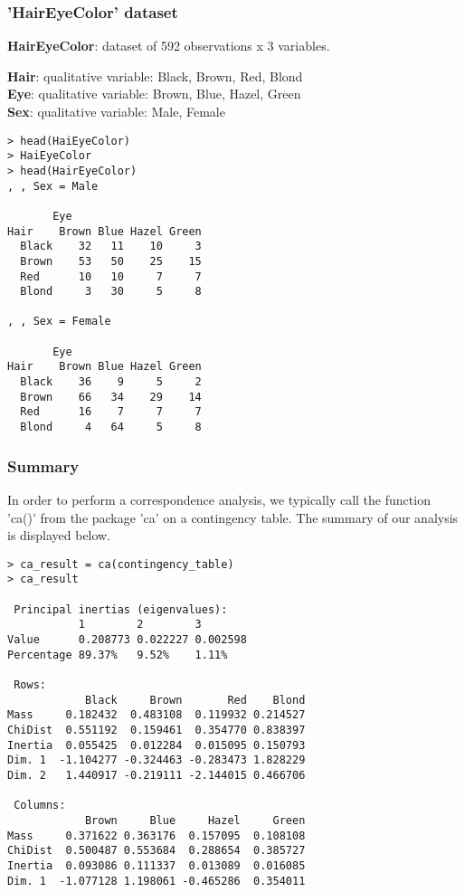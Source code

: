 \documentclass[border=5mm, convert, usenames, dvipsnames,beamer]{standalone}
\begin{document}
\begin{frame}[ fragile]{}
\frametitle{'HairEyeColor' dataset}

\scriptsize
\vspace{40}
\noindent
\textbf{HairEyeColor}: dataset of 592 observations x 3 variables.

\vspace{10}
\noindent
\textbf{Hair}:	qualitative variable: Black, Brown, Red, Blond\\

\vspace{-10}
\noindent
\textbf{Eye}:	qualitative variable: Brown, Blue, Hazel, Green \\

\vspace{-10}
\noindent
\textbf{Sex}:	qualitative variable: Male, Female\\



\begin{lstlisting}[style=R]
> head(HaiEyeColor)
> HaiEyeColor
> head(HairEyeColor)
, , Sex = Male

       Eye
Hair    Brown Blue Hazel Green
  Black    32   11    10     3
  Brown    53   50    25    15
  Red      10   10     7     7
  Blond     3   30     5     8

, , Sex = Female

       Eye
Hair    Brown Blue Hazel Green
  Black    36    9     5     2
  Brown    66   34    29    14
  Red      16    7     7     7
  Blond     4   64     5     8
\end{lstlisting}


\end{frame}




\begin{frame}[ fragile]{}
\frametitle{Summary}

\vspace{50}
\noindent
In order to perform a correspondence analysis, we typically call the function 'ca()' from the package 'ca' on a contingency table. The summary of our analysis is displayed below.

\begin{lstlisting}[style=R]
> ca_result = ca(contingency_table)
> ca_result

 Principal inertias (eigenvalues):
           1        2        3       
Value      0.208773 0.022227 0.002598
Percentage 89.37%   9.52%    1.11%   

 Rows:
            Black     Brown       Red    Blond
Mass     0.182432  0.483108  0.119932 0.214527
ChiDist  0.551192  0.159461  0.354770 0.838397
Inertia  0.055425  0.012284  0.015095 0.150793
Dim. 1  -1.104277 -0.324463 -0.283473 1.828229
Dim. 2   1.440917 -0.219111 -2.144015 0.466706

 Columns:
            Brown     Blue     Hazel     Green
Mass     0.371622 0.363176  0.157095  0.108108
ChiDist  0.500487 0.553684  0.288654  0.385727
Inertia  0.093086 0.111337  0.013089  0.016085
Dim. 1  -1.077128 1.198061 -0.465286  0.354011
\end{lstlisting}
\end{frame}
\end{document}
